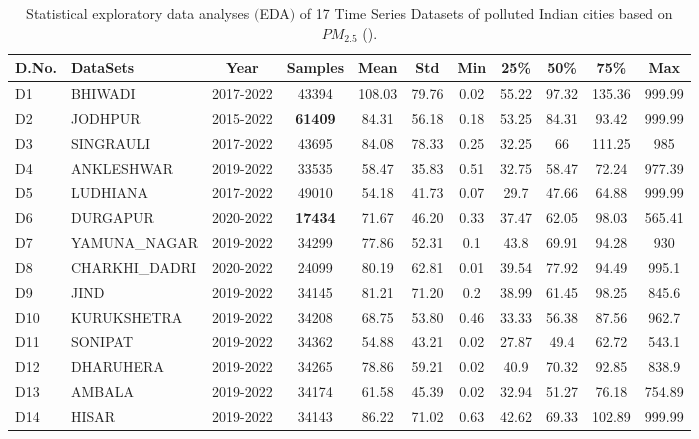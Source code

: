 \documentclass[a4paper,fleqn]{cas-sc}
\begin{document}
\begin{table}[h!]
  \caption{Statistical exploratory data analyses $($EDA$)$ of 17 Time Series Datasets of polluted Indian cities based on $PM_{2.5}$ (\cite{bhawan2020central}).}
  \label{Eda1}
  
  \begin{tabular}{llccccccccc}
  \hline
  
  D.No. & DataSets & Year  & Samples &Mean &Std & Min &25\% &50\% &75\% & Max\\ \hline
  
 D1 &  BHIWADI          & 2017-2022  & 43394   & 108.03 & 79.76  & 0.02 & 55.22   & 97.32       & 135.36 & 999.99 \\ 
 D2 &  JODHPUR     & 2015-2022 &\textbf{61409} & 84.31 & 56.18 & 0.18 & 53.25   & 84.31 & 93.42   & 999.99 \\
 D3 &  SINGRAULI    & 2017-2022 & 43695   & 84.08 & 78.33 & 0.25 & 32.25   & 66          & 111.25  & 985    \\
 D4 &  ANKLESHWAR   & 2019-2022  & 33535     & 58.47 & 35.83 & 0.51 & 32.75   & 58.47 & 72.24   & 977.39 \\ 
 D5 &  LUDHIANA        & 2017-2022  & 49010  & 54.18 & 41.73 & 0.07 & 29.7    & 47.66       & 64.88   & 999.99 \\
 D6 &  DURGAPUR       & 2020-2022 & \textbf{17434}   & 71.67 & 46.20 & 0.33 & 37.47 & 62.05      & 98.03 & 565.41 \\ 
 D7 &  YAMUNA\_NAGAR  & 2019-2022 & 34299   & 77.86  & 52.31 & 0.1  & 43.8    & 69.91       & 94.28   & 930    \\
 D8 &  CHARKHI\_DADRI  & 2020-2022  & 24099   & 80.19 & 62.81 & 0.01 & 39.54  & 77.92       & 94.49  & 995.1  \\ 
 D9 &  JIND             & 2019-2022 & 34145 & 81.21 & 71.20 & 0.2  & 38.99   & 61.45       & 98.25   & 845.6  \\ 
 D10 &  KURUKSHETRA    & 2019-2022  & 34208 & 68.75& 53.80 & 0.46 & 33.33   & 56.38       & 87.56   & 962.7  \\ 
 D11 &  SONIPAT        & 2019-2022  & 34362  & 54.88 & 43.21  & 0.02 & 27.87   & 49.4        & 62.72   & 543.1  \\ 
 D12 &  DHARUHERA     & 2019-2022 & 34265 & 78.86 & 59.21 & 0.02 & 40.9    & 70.32       & 92.85   & 838.9  \\
 D13 &  AMBALA         & 2019-2022 & 34174 & 61.58 & 45.39 & 0.02 & 32.94   & 51.27       & 76.18 & 754.89 \\
 D14 &  HISAR          & 2019-2022 & 34143 & 86.22 & 71.02 & 0.63 & 42.62   & 69.33       & 102.89 & 999.99 \\ 

\end{tabular}
\end{table}
\end{document}

